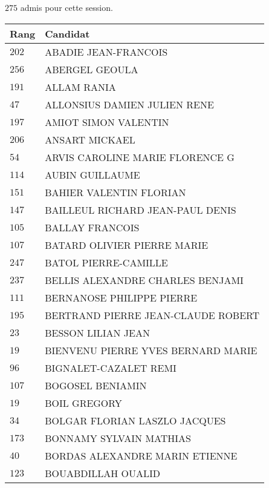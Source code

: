 



  $275$ admis pour cette session.

  \begin{xltabular}{\linewidth}{|l|X|}
    \hline
    \textbf{Rang} & \textbf{Candidat} \\
    \hline
    $202$ & ABADIE JEAN-FRANCOIS \\
    \hline
    $256$ & ABERGEL GEOULA \\
    \hline
    $191$ & ALLAM RANIA \\
    \hline
    $47$ & ALLONSIUS DAMIEN JULIEN RENE \\
    \hline
    $197$ & AMIOT SIMON VALENTIN \\
    \hline
    $206$ & ANSART MICKAEL \\
    \hline
    $54$ & ARVIS CAROLINE MARIE FLORENCE G \\
    \hline
    $114$ & AUBIN GUILLAUME \\
    \hline
    $151$ & BAHIER VALENTIN FLORIAN \\
    \hline
    $147$ & BAILLEUL RICHARD JEAN-PAUL DENIS \\
    \hline
    $105$ & BALLAY FRANCOIS \\
    \hline
    $107$ & BATARD OLIVIER PIERRE MARIE \\
    \hline
    $247$ & BATOL PIERRE-CAMILLE \\
    \hline
    $237$ & BELLIS ALEXANDRE CHARLES BENJAMI \\
    \hline
    $111$ & BERNANOSE PHILIPPE PIERRE \\
    \hline
    $195$ & BERTRAND PIERRE JEAN-CLAUDE ROBERT \\
    \hline
    $23$ & BESSON LILIAN JEAN \\
    \hline
    $19$ & BIENVENU PIERRE YVES BERNARD MARIE \\
    \hline
    $96$ & BIGNALET-CAZALET REMI \\
    \hline
    $107$ & BOGOSEL BENIAMIN \\
    \hline
    $19$ & BOIL GREGORY \\
    \hline
    $34$ & BOLGAR FLORIAN LASZLO JACQUES \\
    \hline
    $173$ & BONNAMY SYLVAIN MATHIAS \\
    \hline
    $40$ & BORDAS ALEXANDRE MARIN ETIENNE \\
    \hline
    $123$ & BOUABDILLAH OUALID \\

\end{xltabular}
